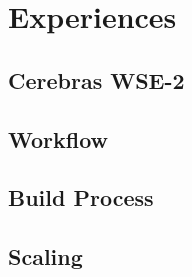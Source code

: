 \chapter{Experiences}\label{chapter:experiences}

\section{Cerebras WSE-2}

\section{Workflow}

\section{Build Process}

\section{Scaling}